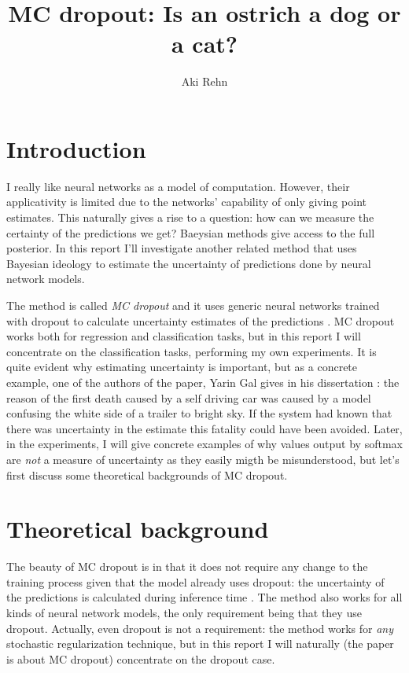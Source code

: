 \documentclass[11pt]{article}
\title{MC dropout: Is an ostrich a dog or a cat?}
\author{Aki Rehn}
\begin{document}
\maketitle

\section{Introduction}

I really like neural networks as a model of computation. However, their applicativity is limited due to the networks' capability of only giving point estimates. This naturally gives a rise to a question: how can we measure the certainty of the predictions we get? Baeysian methods give access to the full posterior. In this report I'll investigate another related method that uses Bayesian ideology to estimate the uncertainty of predictions done by neural network models.

The method is called \textit{MC dropout} and it uses generic neural networks trained with dropout to calculate uncertainty estimates of the predictions \cite{gal2016dropout}. MC dropout works both for regression and classification tasks, but in this report I will concentrate on the classification tasks, performing my own experiments. It is quite evident why estimating uncertainty is important, but as a concrete example, one of the authors of the paper, Yarin Gal gives in his dissertation \cite{gal2016uncertainty}: the reason of the first death caused by a self driving car was caused by a model confusing the white side of a trailer to bright sky. If the system had known that there was uncertainty in the estimate this fatality could have been avoided. Later, in the experiments, I will give concrete examples of why values output by softmax are \textit{not} a measure of uncertainty as they easily migth be misunderstood, but let's first discuss some theoretical backgrounds of MC dropout.

\section{Theoretical background}

The beauty of MC dropout is in that it does not require any change to the training process given that the model already uses dropout: the uncertainty of the predictions is calculated during inference time \cite{gal2016dropout}. The method also works for all kinds of neural network models, the only requirement being that they use dropout. Actually, even dropout is not a requirement: the method works for \textit{any} stochastic regularization technique, but in this report I will naturally (the paper is about MC dropout) concentrate on the dropout case.
\end{document}
